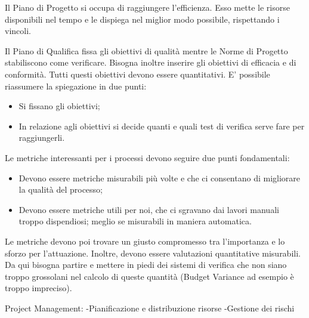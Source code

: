 Il Piano di Progetto si occupa di raggiungere l'efficienza. Esso mette le risorse disponibili
nel tempo e le dispiega nel miglior modo possibile, rispettando i vincoli.

Il Piano di Qualifica fissa gli obiettivi di qualità mentre le Norme di Progetto stabiliscono
come verificare. Bisogna inoltre inserire gli obiettivi di efficacia e di
conformità. Tutti questi obiettivi devono essere quantitativi.
E' possibile riassumere la spiegazione in due punti:
\begin{itemize}
\item Si fissano gli obiettivi;
\item In relazione agli obiettivi si decide quanti e quali test di verifica serve fare per raggiungerli.
\end{itemize}

Le metriche interessanti per i processi devono seguire due punti fondamentali:
\begin{itemize}
\item Devono essere metriche misurabili più volte e che ci consentano di migliorare la qualità del processo;
\item Devono essere metriche utili per noi, che ci sgravano dai lavori manuali troppo dispendiosi; meglio se misurabili in maniera automatica. 
\end{itemize}
Le metriche devono poi trovare un giusto compromesso tra l'importanza e lo sforzo per
l'attuazione. Inoltre, devono essere valutazioni quantitative misurabili. Da qui bisogna
partire e mettere in piedi dei sistemi di verifica che non siano troppo grossolani nel
calcolo di queste quantità (Budget Variance ad esempio è troppo impreciso).

Project Management:
-Pianificazione e distribuzione risorse
-Gestione dei rischi
